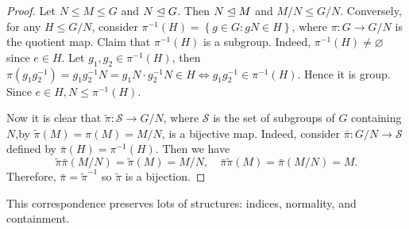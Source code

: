 \documentclass[a4paper]{article}
\begin{document}
    \begin{proof}
        Let $ N \le M \le G $ and $ N \trianglelefteq G $. Then $ N \trianglelefteq M $ and $ M/N \le G/N $. Conversely, for any $ H\le G/N $, consider $ \pi^{-1}(H)=\left\{ g\in G: gN\in H\right\} $, where $ \pi: G\to G/N $ is the quotient map. Claim that $ \pi^{-1}(H) $ is a subgroup. Indeed, $\pi^{-1}(H)\neq \varnothing$ since $e\in H$. Let $ g_1,g_2\in \pi^{-1}(H) $, then $ \pi(g_1g_2^{-1})=g_1g_2^{-1}N=g_1N\cdot g_2^{-1}N\in H \Leftrightarrow g_1g_2^{-1}\in \pi^{-1}(H) $. Hence it is group. Since $ e\in H, N\le \pi^{-1}(H) $. 

        Now it is clear that $\tilde{\pi}:\mathcal{S}\to G/N$, where $\mathcal{S}$ is the set of subgroups of $G$ containing $N$,by $ \tilde{\pi}(M)=\pi(M)=M/N$, is a bijective map. Indeed, consider $ \bar{\pi}:G/N\to \mathcal{S} $ defined by $ \bar{\pi}(H)=\pi^{-1}(H) $. Then we have 
        \[
            \tilde{\pi}\bar{\pi}(M/N)=\tilde{\pi}(M)=M/N,\quad \bar{\pi}\tilde{\pi}(M)=\bar{\pi}(M/N)=M
        .\]
        Therefore, $ \bar{\pi}=\tilde{\pi}^{-1} $ so $ \tilde{\pi} $ is a bijection.
    \end{proof}
    \begin{remark}
        This correspondence preserves lots of structures: indices, normality, and containment.
    \end{remark}
    \newpage
\end{document}
